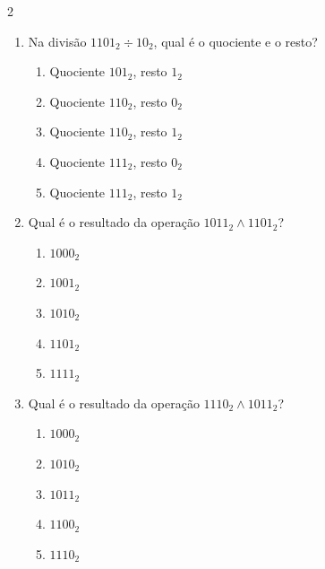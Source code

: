 \documentclass[a4paper,12pt]{article}
\begin{document}
\begin{multicols}{2}
\begin{enumerate}[leftmargin=*]
\vspace{0.2cm}


\item Na divisão
$1101_2 \div 10_2$,
qual é o quociente e o resto?

\begin{enumerate}[label=(\Alph*)]
    \item Quociente $101_2$, resto $1_2$
    \item Quociente $110_2$, resto $0_2$
    \item Quociente $110_2$, resto $1_2$
    \item Quociente $111_2$, resto $0_2$
    \item Quociente $111_2$, resto $1_2$
\end{enumerate}

\vspace{0.2cm}



\item Qual é o resultado da operação
$1011_2 \land 1101_2$?

\begin{enumerate}[label=(\Alph*)]
    \item $1000_2$
    \item $1001_2$
    \item $1010_2$
    \item $1101_2$
    \item $1111_2$
\end{enumerate}

\vspace{0.2cm}


\item Qual é o resultado da operação
$1110_2 \land 1011_2$?

\begin{enumerate}[label=(\Alph*)]
    \item $1000_2$
    \item $1010_2$
    \item $1011_2$
    \item $1100_2$
    \item $1110_2$
\end{enumerate}

\vspace{0.2cm}




\end{enumerate}
\end{multicols}
\end{document}
